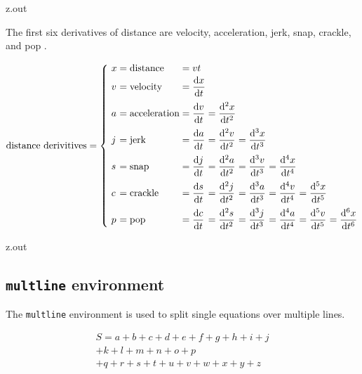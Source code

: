 \MyIOT


\begin{VerbatimOut}{z.out}

The first six derivatives of distance are velocity, acceleration, jerk, snap, crackle, and pop \cite{reid2013}.

\begin{equation}
  \AtBeginEnvironment{array}{\everymath{\displaystyle}}
  \arraycolsep = 0pt
  \text{distance derivitives} = \left\{\ %
    \begin{array}{llllllll}
      x&      {}=\text{distance}&     {}=vt\\[2pt]
      v&      {}=\text{velocity}&     {}=\frac{\di x}{\di t}\\[9pt]
      a&      {}=\text{acceleration}& {}=\frac{\di v}{\di t}& {}=\frac{\di^2x}{\di t^2}\\[9pt]
      \mit j& {}=\text{jerk}&         {}=\frac{\di a}{\di t}& {}=\frac{\di^2v}{\di t^2}&
        {}=\frac{\di^3x}{\di t^3}\\[9pt]
      s
        & {}=\text{snap}
        & {}=\frac{\di \mit j}{\di t}
        & {}=\frac{\di^2a}{\di t^2}
        & {}=\frac{\di^3v}{\di t^3}
        & {}=\frac{\di^4x}{\di t^4}\\[9pt]
      c
        & {}=\text{crackle}
        & {}=\frac{\di s}{\di t}
        & {}=\frac{\di^2\mit j}{\di t^2}
        & {}=\frac{\di^3a}{\di t^3}
        & {}=\frac{\di^4v}{\di t^4}
        & {}=\frac{\di^5x}{\di t^5}\\[9pt]
      p
        & {}=\text{pop}
        & {}=\frac{\di c}{\di t}
        & {}=\frac{\di^2s}{\di t^2}
        & {}=\frac{\di^3\mit j}{\di t^3}
        & {}=\frac{\di^4a}{\di t^4}
        & {}=\frac{\di^5v}{\di t^5}
        & {}=\frac{\di^6x}{\di t^6}
    \end{array}
  \right.
\end{equation}
\end{VerbatimOut}

\MyIOT


\begin{VerbatimOut}{z.out}

\subsection{\texttt{multline} environment}

The \verb+multline+ environment is used
to split single equations over multiple lines.

\begin{multline}
  S = a + b + c + d + e + f + g + h + i + j\\
  + k + l + m + n + o + p\\
  + q + r + s + t + u + v + w + x + y + z
\end{multline}
\end{VerbatimOut}

